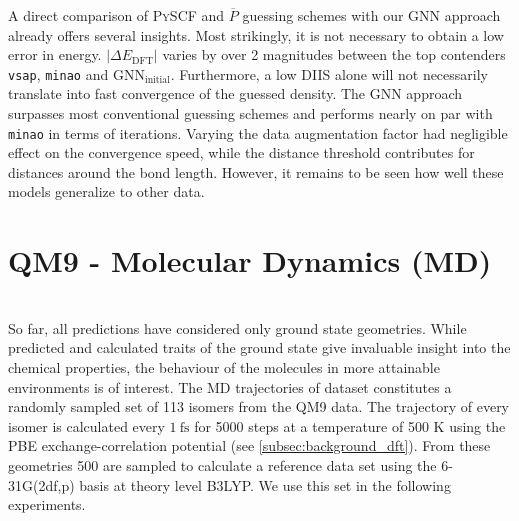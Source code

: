 A direct comparison of \textsc{PySCF} and $\overline{P}$ guessing schemes with our GNN approach already offers several insights. Most strikingly, it is not necessary to obtain a low error in energy. $|\Delta E_\text{DFT}|$ varies by over 2 magnitudes between the top contenders \texttt{vsap}, \texttt{minao} and $\text{GNN}_\text{initial}$. Furthermore, a low DIIS alone will not necessarily translate into fast convergence of the guessed density. The GNN approach surpasses most conventional guessing schemes and performs nearly on par with \texttt{minao} in terms of iterations. Varying the data augmentation factor had negligible effect on the convergence speed, while the distance threshold contributes for distances around the bond length. However, it remains to be seen how well these models generalize to other data. 

\section{QM9 -  Molecular Dynamics (MD)}
\label{sec:qm9_md_isomers_benchmark}
\\
So far, all predictions have considered only ground state geometries. While predicted and calculated traits of the ground state give invaluable insight into the chemical properties, the behaviour of the molecules in more attainable environments is of interest. The MD trajectories of  dataset \parencite{ref:qm9_isomers_md} constitutes a randomly sampled set of 113 isomers from the QM9  data. The trajectory of every isomer is calculated every $\SI{1}{\femto\second}$ for 5000 steps at a temperature of 500 K using the PBE exchange-correlation potential (see \ref{subsec:background_dft}). From these geometries 500 are sampled to calculate a reference data set using the 6-31G(2df,p) basis at theory level B3LYP. We use this set in the following experiments. 
\newpage
